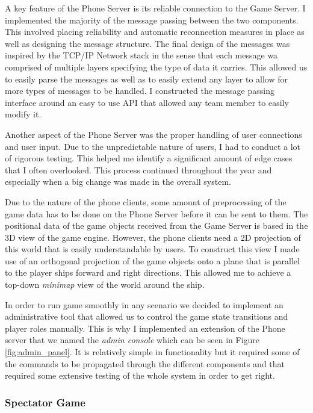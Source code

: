 \documentclass[a4paper,11pt]{article}
\begin{document}
A key feature of the Phone Server is its reliable connection to the Game Server. I implemented the majority of the message passing between the two components. This involved placing reliability and automatic reconnection measures in place as well as designing the message structure. The final design of the messages was inspired by the TCP/IP Network stack in the sense that each message wa comprised of multiple layers specifying the type of data it carries. This allowed us to easily parse the messages as well as to easily extend any layer to allow for more types of messages to be handled. I constructed the message passing interface around an easy to use API that allowed any team member to easily modify it.

Another aspect of the Phone Server was the proper handling of user connections and user input. Due to the unpredictable nature of users, I had to conduct a lot of rigorous testing. This helped me identify a significant amount of edge cases that I often overlooked. This process continued throughout the year and especially when a big change was made in the overall system.

Due to the nature of the phone clients, some amount of preprocessing of the game data has to be done on the Phone Server before it can be sent to them. The positional data of the game objects received from the Game Server is based in the 3D view of the game engine. However, the phone clients need a 2D projection of this world that is easily understandable by users. To construct this view I made use of an orthogonal projection of the game objects onto a plane that is parallel to the player ships forward and right directions. This allowed me to achieve a top-down \emph{minimap} view of the world around the ship.

In order to run game smoothly in any scenario we decided to implement an administrative tool that allowed us to control the game state transitions and player roles manually. This is why I implemented an extension of the Phone server that we named the \emph{admin console} which can be seen in Figure \ref{fig:admin_panel}. It is relatively simple in functionality but it required some of the commands to be propagated through the different components and that required some extensive testing of the whole system in order to get right.

\subsubsection{Spectator Game}
\end{document}
